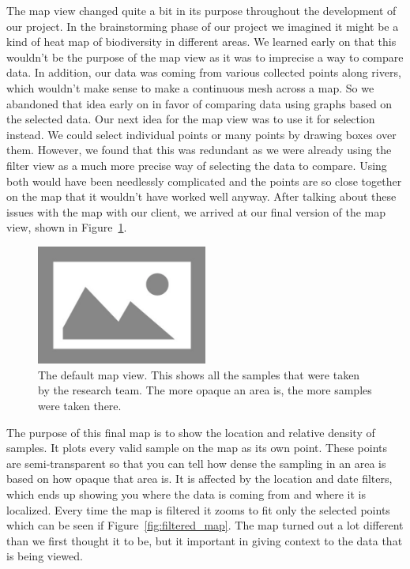 \documentclass[10pt,draftclsnofoot,onecolumn]{IEEEtran}
\begin{document}
The map view changed quite a bit in its purpose throughout the development of our project.
In the brainstorming phase of our project we imagined it might be a kind of heat map of biodiversity in different areas.
We learned early on that this wouldn't be the purpose of the map view as it was to imprecise a way to compare data.
In addition, our data was coming from various collected points along rivers, which wouldn't make sense to make a continuous mesh across a map.
So we abandoned that idea early on in favor of comparing data using graphs based on the selected data.
Our next idea for the map view was to use it for selection instead.
We could select individual points or many points by drawing boxes over them.
However, we found that this was redundant as we were already using the filter view as a much more precise way of selecting the data to compare.
Using both would have been needlessly complicated and the points are so close together on the map that it wouldn't have worked well anyway.
After talking about these issues with the map with our client, we arrived at our final version of the map view, shown in Figure~\ref{fig:default_map}.

\begin{figure}[h]
	\centering
	\includegraphics[width=0.50\textwidth]{images/default_map.png}
	\captionsetup{justification=centering}
	\caption{
		The default map view.
		This shows all the samples that were taken by the research team. The more opaque an area is, the more samples were taken there.
	}
	\label{fig:default_map}
\end{figure}

The purpose of this final map is to show the location and relative density of samples.
It plots every valid sample on the map as its own point.
These points are semi-transparent so that you can tell how dense the sampling in an area is based on how opaque that area is.
It is affected by the location and date filters, which ends up showing you where the data is coming from and where it is localized.
Every time the map is filtered it zooms to fit only the selected points which can be seen if Figure~\ref{fig:filtered_map}.
The map turned out a lot different than we first thought it to be, but it important in giving context to the data that is being viewed.
\end{document}
